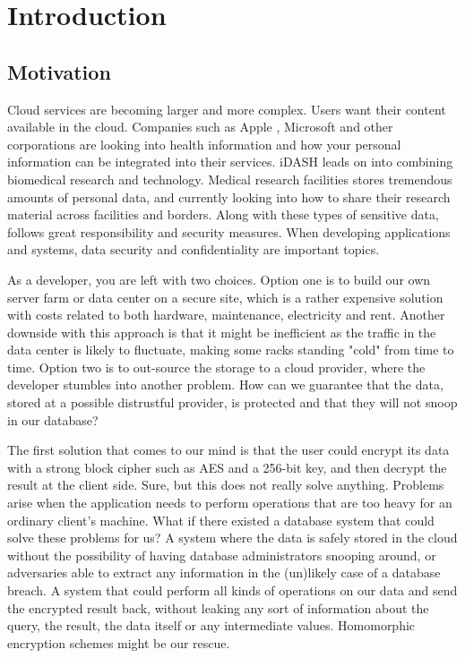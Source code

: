 \chapter{Introduction}
\label{chp:introduction}

\section{Motivation}

Cloud services are becoming larger and more complex. Users want their content available in the cloud. Companies such as Apple \cite{apple_health}, Microsoft \cite{microsoft_health} and other corporations are looking into health information and how your personal information can be integrated into their services. iDASH \cite{iDASH} leads on into combining biomedical research and technology.  Medical research facilities stores tremendous amounts of personal data, and currently looking into how to share their research material across facilities and borders. Along with these types of sensitive data, follows great responsibility and security measures. When developing applications and systems, data security and confidentiality are important topics.

As a developer, you are left with two choices. Option one is to build our own server farm or data center on a secure site, which is a rather expensive solution with costs related to both hardware, maintenance, electricity and rent. Another downside with this approach is that it might be inefficient as the traffic in the data center is likely to fluctuate, making some racks standing "cold" from time to time. Option two is to out-source the storage to a cloud provider, where the developer stumbles into another problem. How can we guarantee that the data, stored at a possible distrustful provider, is protected and that they will not snoop in our database?

The first solution that comes to our mind is that the user could encrypt its data with a strong block cipher such as AES and a 256-bit key, and then decrypt the result at the client side. Sure, but this does not really solve anything. Problems arise when the application needs to perform operations that are too heavy for an ordinary client's machine. What if there existed a database system that could solve these problems for us? A system where the data is safely stored in the cloud without the possibility of having database administrators snooping around, or adversaries able to extract any information in the (un)likely case of a database breach. A system that could perform all kinds of operations on our data and send the encrypted result back, without leaking any sort of information about the query, the result, the data itself or any intermediate values. Homomorphic encryption schemes might be our rescue.

